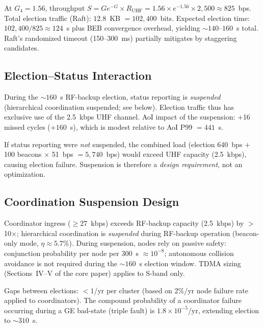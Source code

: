 \documentclass[journal]{IEEEtran}
\begin{document}
At $G_4 = 1.56$, throughput $S = G e^{-G} \times R_{\text{UHF}} = 1.56 \times e^{-1.56} \times 2{,}500 \approx 825$~bps. Total election traffic (Raft): $12.8$~KB $= 102{,}400$~bits. Expected election time: $102{,}400 / 825 \approx 124$~s plus BEB convergence overhead, yielding ${\sim}140$--$160$~s total. Raft's randomized timeout (150--300~ms) partially mitigates by staggering candidates.

\subsection{Election--Status Interaction}

During the ${\sim}160$~s RF-backup election, status reporting is \emph{suspended} (hierarchical coordination suspended; see below). Election traffic thus has exclusive use of the 2.5~kbps UHF channel. AoI impact of the suspension: $+$16 missed cycles ($+160$~s), which is modest relative to AoI P99 $= 441$~s.

If status reporting were \emph{not} suspended, the combined load (election 640~bps $+$ 100 beacons $\times$ 51~bps $= 5{,}740$~bps) would exceed UHF capacity (2.5~kbps), causing election failure. Suspension is therefore a \emph{design requirement}, not an optimization.

\subsection{Coordination Suspension Design}

Coordinator ingress ($\geq$27~kbps) exceeds RF-backup capacity (2.5~kbps) by $>$10$\times$; hierarchical coordination is \emph{suspended} during RF-backup operation (beacon-only mode, $\eta \approx 5.7\%$). During suspension, nodes rely on passive safety: conjunction probability per node per 300~s $\approx 10^{-8}$; autonomous collision avoidance is not required during the ${\sim}160$~s election window. TDMA sizing (Sections~IV--V of the core paper) applies to S-band only.

Gaps between elections: $< 1$/yr per cluster (based on 2\%/yr node failure rate applied to coordinators). The compound probability of a coordinator failure occurring during a GE bad-state (triple fault) is $1.8 \times 10^{-5}$/yr, extending election to ${\sim}310$~s.


\end{document}
